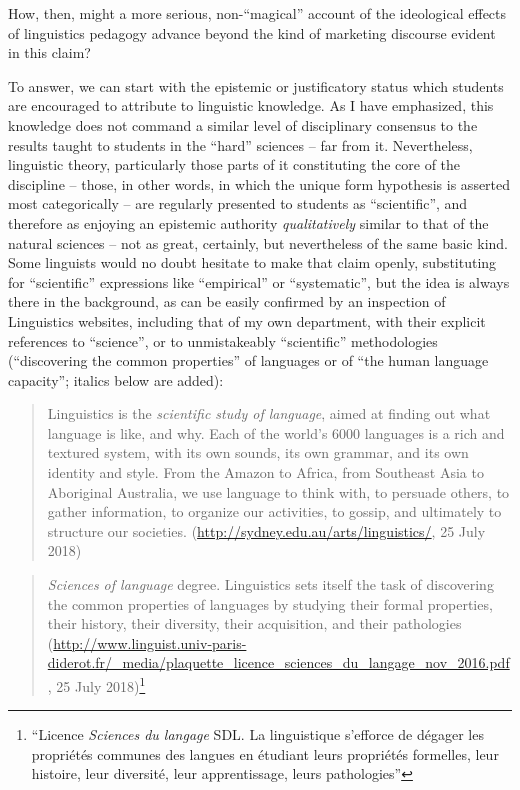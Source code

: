 \documentclass[output=paper]{langscibook}
\begin{document}
How, then, might a more serious, non-``magical'' account of the ideological effects of linguistics pedagogy advance beyond the kind of marketing discourse evident in this claim?

To answer, we can start with the epistemic or justificatory status which students are encouraged to attribute to linguistic knowledge. As I have emphasized, this knowledge does not command a similar level of disciplinary consensus to the results taught to students in the ``hard'' sciences – far from it.  Nevertheless, linguistic theory, particularly those parts of it constituting the core of the discipline – those, in other words, in which the unique form hypothesis is asserted most categorically – are regularly presented to students as ``scientific'', and therefore as enjoying an epistemic authority \emph{qualitatively} similar to that of the natural sciences – not as great, certainly, but nevertheless of the same basic kind. Some linguists would no doubt hesitate to make that claim openly, substituting for ``scientific'' expressions like ``empirical'' or ``systematic'', but the idea is always there in the background, as can be easily confirmed by an inspection of Linguistics websites, including that of my own department, with their explicit references to ``science'', or to unmistakeably ``scientific'' methodologies (``discovering the common properties'' of languages or of ``the human language capacity''; italics below are added):

\begin{quotation}
Linguistics is the \emph{scientific study of language}, aimed at finding out what language is like, and why. Each of the world's 6000 languages is a rich and textured system, with its own sounds, its own grammar, and its own identity and style. From the Amazon to Africa, from Southeast Asia to Aboriginal Australia, we use language to think with, to persuade others, to gather information, to organize our activities, to gossip, and ultimately to structure our societies. (\url{http://sydney.edu.au/arts/linguistics/}, 25 July 2018)
\end{quotation}

\begin{quotation}
\emph{Sciences of language} degree. Linguistics sets itself the task of discovering the common properties of languages by studying their formal properties, their history, their diversity, their acquisition, and their pathologies (\url{http://www.linguist.univ-paris-diderot.fr/\_media/plaquette_licence_sciences_du_langage_nov_2016.pdf}, 25 July 2018)\footnote{``Licence \emph{Sciences du langage} SDL. La linguistique s'efforce de dégager les propriétés communes des langues en étudiant leurs propriétés formelles, leur histoire, leur diversité, leur apprentissage, leurs pathologies''}
\end{quotation}
\end{document}

